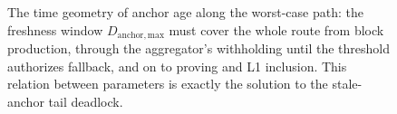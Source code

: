 \begin{figure}[htbp]
\caption{The time geometry of anchor age along the worst-case path: the freshness window $D_{\mathrm{anchor,max}}$ must cover the whole route from block production, through the aggregator's withholding until the threshold authorizes fallback, and on to proving and L1 inclusion. This relation between parameters is exactly the solution to the stale-anchor tail deadlock.}
\label{fig:9}
\end{figure}

